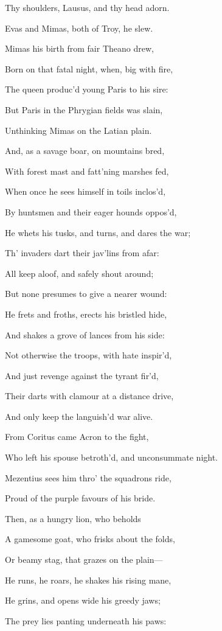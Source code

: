 Thy shoulders, Lausus, and thy head adorn.

Evas and Mimas, both of Troy, he slew.

Mimas his birth from fair Theano drew,

Born on that fatal night, when, big with fire,

The queen produc’d young Paris to his sire:

But Paris in the Phrygian fields was slain,

Unthinking Mimas on the Latian plain.

And, as a savage boar, on mountains bred,

With forest mast and fatt’ning marshes fed,

When once he sees himself in toils inclos’d,

By huntsmen and their eager hounds oppos’d,

He whets his tusks, and turns, and dares the war;

Th’ invaders dart their jav’lins from afar:

All keep aloof, and safely shout around;

But none presumes to give a nearer wound:

He frets and froths, erects his bristled hide,

And shakes a grove of lances from his side:

Not otherwise the troops, with hate inspir’d,

And just revenge against the tyrant fir’d,

Their darts with clamour at a distance drive,

And only keep the languish’d war alive.

From Coritus came Acron to the fight,

Who left his spouse betroth’d, and unconsummate night.

Mezentius sees him thro’ the squadrons ride,

Proud of the purple favours of his bride.

Then, as a hungry lion, who beholds

A gamesome goat, who frisks about the folds,

Or beamy stag, that grazes on the plain—

He runs, he roars, he shakes his rising mane,

He grins, and opens wide his greedy jaws;

The prey lies panting underneath his paws:

